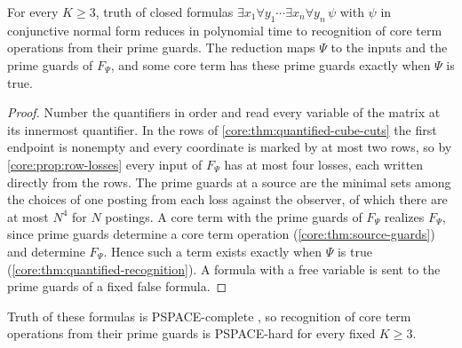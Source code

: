 \begin{theorem}
\label{core:thm:recognition-reduction}
For every $K\ge3$, truth of closed formulas
$\exists x_1\forall y_1\cdots\exists x_n\forall y_n\,\psi$ with $\psi$ in
conjunctive normal form reduces in polynomial time to recognition of core
term operations from their prime guards. The reduction maps $\Psi$ to the
inputs and the prime guards of $F_\Psi$, and some core term has these
prime guards exactly when $\Psi$ is true.
\end{theorem}
\begin{proof}
Number the quantifiers in order and read every variable of the matrix at
its innermost quantifier. In the rows of
\cref{core:thm:quantified-cube-cuts} the first endpoint is nonempty and
every coordinate is marked by at most two rows, so by
\cref{core:prop:row-losses} every input of $F_\Psi$ has at most four
losses, each written directly from the rows. The prime
guards at a source are the minimal sets among the choices of one posting
from each loss against the observer, of which there are at most $N^4$ for
$N$ postings. A core term with the prime guards of $F_\Psi$ realizes
$F_\Psi$, since prime guards determine a core term operation
(\cref{core:thm:source-guards}) and determine $F_\Psi$. Hence such a term
exists exactly when $\Psi$ is true (\cref{core:thm:quantified-recognition}).
A formula with a free variable is sent to the prime guards of a fixed
false formula.
\end{proof}

Truth of these formulas is PSPACE-complete
\cite[Theorem~4.3]{StockmeyerMeyer1973}, so recognition of core term
operations from their prime guards is PSPACE-hard for every fixed
$K\ge3$.

